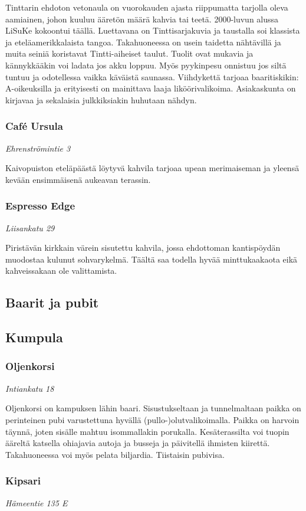 \documentclass[../ala_hataile.tex]{subfiles}
\begin{document}
Tinttarin ehdoton vetonaula on vuorokauden
ajasta riippumatta tarjolla oleva
aamiainen, johon kuuluu ääretön määrä
kahvia tai teetä. 2000-luvun alussa LiSuKe kokoontui täällä. Luettavana on Tinttisarjakuvia
ja taustalla soi klassista ja eteläamerikkalaista
tangoa. Takahuoneessa on
usein taidetta nähtävillä ja muita seiniä koristavat
Tintti-aiheiset taulut.
Tuolit ovat mukavia ja kännykkääkin
voi ladata jos akku loppuu. Myös pyykinpesu
onnistuu jos siltä tuntuu ja odotellessa
vaikka käväistä saunassa. Viihdykettä tarjoaa
baaritiskikin: A-oikeuksilla ja erityisesti
on mainittava laaja liköörivalikoima.
Asiakaskunta on kirjavaa ja sekalaisia julkkiksiakin
huhutaan nähdyn.
\subsubsection*{Café Ursula}
\textit{Ehrenströmintie 3}

Kaivopuiston eteläpäästä löytyvä kahvila
tarjoaa upean merimaiseman ja yleensä
kevään ensimmäisenä aukeavan terassin.
\subsubsection*{Espresso Edge}
\textit{Liisankatu 29}

Piristävän kirkkain värein sisutettu
kahvila, jossa ehdottoman kantispöydän
muodostaa kulunut sohvarykelmä. Täältä
saa todella hyvää minttukaakaota eikä kahveissakaan
ole valittamista.

\subsection*{Baarit ja pubit}
\subsection*{Kumpula}
\subsubsection*{Oljenkorsi}
\textit{Intiankatu 18}

Oljenkorsi on kampuksen lähin baari.
Sisustukseltaan ja tunnelmaltaan paikka
on perinteinen pubi varustettuna hyvällä
(pullo-)olutvalikoimalla. Paikka
on harvoin täynnä, joten sisälle mahtuu
isommallakin porukalla. Kesäterassilta voi
tuopin ääreltä katsella ohiajavia autoja ja
busseja ja päivitellä ihmisten kiirettä. Takahuoneessa
voi myös pelata biljardia. Tiistaisin
pubivisa.
\subsubsection*{Kipsari}
\textit{Hämeentie 135 E}
\end{document}
